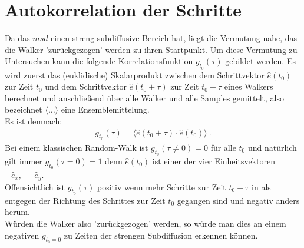 \documentclass[a4paper, 12pt]{report}
\begin{document}
\section{Autokorrelation der Schritte}
Da das $msd$ einen streng subdiffusive Bereich hat, liegt die Vermutung nahe, das die Walker 'zurückgezogen' werden zu ihren Startpunkt. Um diese Vermutung zu Untersuchen kann die folgende Korrelationsfunktion $g_{t_0}(\tau)$ gebildet werden. Es wird zuerst das (euklidische) Skalarprodukt zwischen dem Schrittvektor $\hat{e}(t_0)$ zur Zeit $t_0$ und dem Schrittvektor \break $\hat{e}(t_0+\tau)$ zur Zeit $t_0 + \tau$ eines Walkers berechnet und anschließend über alle Walker und alle Samples gemittelt, also bezeichnet $\langle \dots \rangle$ eine Ensemblemittelung. \\
\noindent Es ist demnach:
\begin{align}
g_{t_0}(\tau) = \langle \hat{e}(t_0+\tau) \cdot \hat{e}(t_0) \rangle\ .
\end{align}
Bei einem klassischen Random-Walk ist $g_{t_0}(\tau \neq 0)= 0$ für alle $t_0$ und natürlich gilt immer $g_{t_0}(\tau = 0)= 1$ denn $\hat{e}(t_0)$ ist einer der vier Einheitsvektoren $\pm \hat{e}_x,\ \pm \hat{e}_y$.
\\
Offensichtlich ist $g_{t_0}(\tau)$ positiv wenn mehr Schritte zur Zeit $t_0+\tau$ in als entgegen der Richtung des Schrittes zur Zeit $t_0$ gegangen sind und negativ anders herum. 
\\
\noindent Würden die Walker also 'zurückgezogen' werden, so würde man dies an einem negativen $g_{t_0=0}$ zu Zeiten der strengen Subdiffusion erkennen können. 
\end{document}
